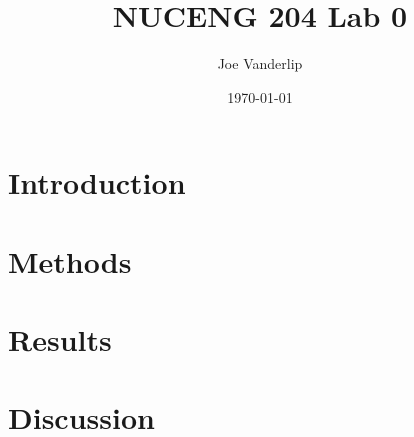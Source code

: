 \documentclass[11pt]{article}
\title{NUCENG 204 Lab 0}
\author{Joe Vanderlip}
\date{\today}
\begin{document}
\maketitle

\section*{Introduction}
\label{sec:intro}


\section*{Methods}
\label{sec:meth}


\section*{Results}
\label{sec:res}


\section*{Discussion}
\label{sec:disc}




\end{document}
